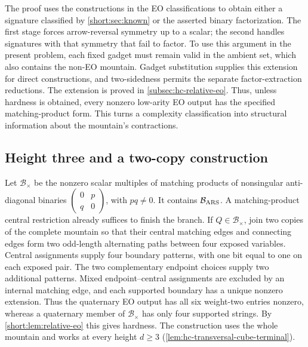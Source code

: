 \documentclass[11pt,letterpaper,onecolumn]{article}
\theoremstyle{plain}
\theoremstyle{definition}
\theoremstyle{remark}
\begin{document}
The proof uses the constructions in the EO classifications
\cite{MengWangXia2025EO,CaiFuShao2020ARS} to obtain either a signature
classified by \cref{short:sec:known} or the asserted binary factorization.
The first stage forces arrow-reversal symmetry up to a scalar; the
second handles signatures with that symmetry that fail to factor.
To use this argument in the present problem, each fixed gadget must
remain valid in the ambient set, which also contains the non-EO
mountain. Gadget substitution supplies this extension for direct
constructions, and two-sidedness permits the separate factor-extraction
reductions. The extension is proved in
\cref{subsec:hc-relative-eo}. Thus, unless hardness
is obtained, every nonzero low-arity EO output has the specified
matching-product form. This turns a complexity classification into
structural information about the mountain's contractions.

\subsection{Height three and a two-copy construction}

Let \(\mathcal B_\times\) be the nonzero scalar multiples of matching
products of nonsingular anti-diagonal binaries
\(\left(\begin{smallmatrix}0&p\\q&0\end{smallmatrix}\right)\), with
\(pq\ne0\). It contains \(\mathcal B_{\rm ARS}\).
A matching-product central restriction already suffices to finish the
branch. If \(Q\in\mathcal B_\times\), join two copies of the complete
mountain so that their central matching edges and connecting edges form
two odd-length alternating paths between four exposed variables. Central
assignments supply four boundary patterns, with one bit equal to one on
each exposed pair. The two complementary endpoint choices supply two
additional patterns. Mixed endpoint--central assignments are excluded
by an internal matching edge, and each supported boundary has a unique
nonzero extension. Thus the quaternary EO output has all six weight-two
entries nonzero, whereas a quaternary member of \(\mathcal B_\times\)
has only four supported strings. By \cref{short:lem:relative-eo} this
gives hardness. The construction uses the whole mountain and works at
every height \(d\ge3\) (\cref{lem:hc-transversal-cube-terminal}).
\end{document}
